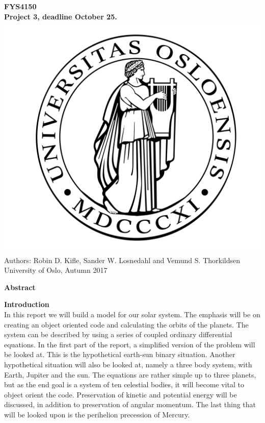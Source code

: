 \documentclass[10pt,a4paper]{article}
\begin{document}
\begin{center}
{\LARGE\bf
FYS4150\\
Project 3, deadline October 25.
}
 \includegraphics[scale=0.075]{uio.png}\\
Authors: Robin D. Kifle, Sander W. Losnedahl and Vemund S. Thorkildsen\\
University of Oslo, Autumn 2017

\vspace{3cm}
{\LARGE\bf
Abstract
}

\end{center}

\newpage

{\LARGE\bf
Introduction
}\\

\noindent In this report we will build a model for our solar system. The emphasis will be on creating an object oriented code and calculating the orbits of the planets. The system can be described by using a series of coupled ordinary differential equations. In the first part of the report, a simplified version of the problem will be looked at. This is the hypothetical earth-sun binary situation. Another hypothetical situation will also be looked at, namely a three body system, with Earth, Jupiter and the sun. The equations are rather simple up to three planets, but as the end goal is a system of ten celestial bodies, it will become vital to object orient the code. Preservation of kinetic and potential energy will be discussed, in addition to preservation of angular momentum. The last thing that will be looked upon is the perihelion precession of Mercury. \\
\end{document}
